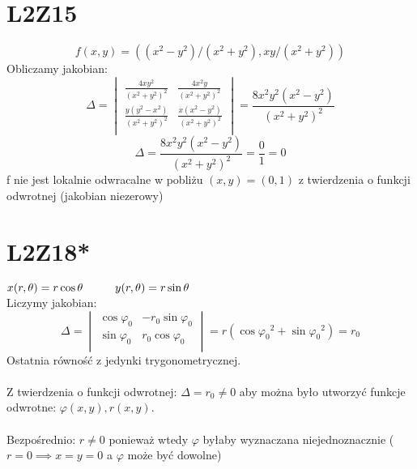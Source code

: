 \documentclass{article}
\title{}
\date{20.10.2020}
\author{Maurycy Borkowski}
\newcommand\tab[1][1cm]{\hspace*{#1}}
\begin{document}
\maketitle

\section{L2Z15}
$$
f(x,y) = ((x^2 - y^2)/(x^2+y^2), xy/(x^2+y^2))
$$
Obliczamy jakobian:
$$
\Delta = 
\begin{vmatrix}
\frac{4xy^2}{(x^2+y^2)^2} & \frac{4x^2y}{(x^2+y^2)^2}\\
\frac{y(y^2-x^2)}{(x^2+y^2)^2} & \frac{x(x^2-y^2)}{(x^2+y^2)^2} \\
\end{vmatrix}
= \frac{8x^2y^2(x^2-y^2)}{(x^2+y^2)^2}
$$
$$
\Delta = \frac{8x^2y^2(x^2-y^2)}{(x^2+y^2)^2} = \frac{0}{1} = 0
$$
f nie jest lokalnie odwracalne w pobliżu $(x,y) = (0,1)$ z twierdzenia o funkcji odwrotnej (jakobian niezerowy)
\section{L2Z18*}
$x(r,\theta) = r\cos{\theta} \tab y(r,\theta) = r\sin{\theta}$\\
Liczymy jakobian:
$$
\Delta = 
\begin{vmatrix}
\cos{\varphi_0} & -r_0\sin{\varphi_0}\\
\sin{\varphi_0} & r_0\cos{\varphi_0}\\
\end{vmatrix} =
r(\cos{\varphi_0}^2 + \sin{\varphi_0}^2) = r_0
$$
Ostatnia równość z jedynki trygonometrycznej.\\\\
Z twierdzenia o funkcji odwrotnej: $\Delta = r_0 \neq 0$ aby można było utworzyć funkcje odwrotne: $\varphi(x,y), r(x,y)$.\\\\
Bezpośrednio: $r \neq 0$ ponieważ wtedy $\varphi$ byłaby wyznaczana niejednoznacznie ($r = 0 \implies x = y = 0$ a $\varphi$ może być dowolne)
\end{document}
